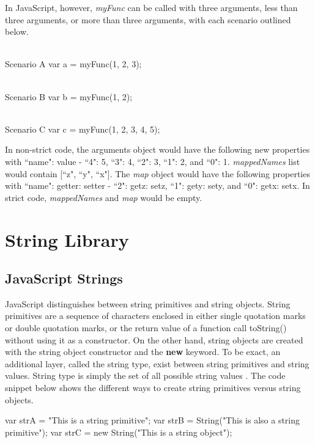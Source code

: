 \documentclass[a4paper,11pt,twoside]{report}
\begin{document}
In JavaScript, however, \textit{myFunc} can be called with three arguments, less than three arguments, or more than three arguments, with each scenario outlined below.
\begin{adjustwidth}{4cm}{4cm}
\begin{lstjs}
\\ Scenario A
var a = myFunc(1, 2, 3);

\\ Scenario B
var b = myFunc(1, 2);

\\ Scenario C
var c = myFunc(1, 2, 3, 4, 5);
\end{lstjs}
\end{adjustwidth}
In non-strict code, the arguments object would have the following new properties with ``name": value - ``4": 5, ``3": 4, ``2": 3, ``1": 2, and ``0": 1. \textit{mappedNames} list would contain [``z", ``y", ``x"]. The \textit{map} object would have the following properties with ``name": getter: setter - ``2": getz: setz, ``1": gety: sety, and ``0": getx: setx. In strict code, \textit{mappedNames} and \textit{map} would be empty.

\chapter{String Library}
\section{JavaScript Strings}
JavaScript distinguishes between string primitives and string objects. String primitives are a sequence of characters enclosed in either single quotation marks or double quotation marks, or the return value of a function call toString() without using it as a constructor. On the other hand, string objects are created with the string object constructor and the \textbf{new} keyword. To be exact, an additional layer, called the string type, exist between string primitives and string values. String type is simply the set of all possible string values \cite{EcmaScript}. The code snippet below shows the different ways to create string primitives versus string objects.
\begin{adjustwidth}{4cm}{4cm}
\begin{lstjs}
var strA = "This is a string primitive";
var strB = String("This is also a string primitive");
var strC = new String("This is a string object");
\end{lstjs}
\end{adjustwidth}
\end{document}

